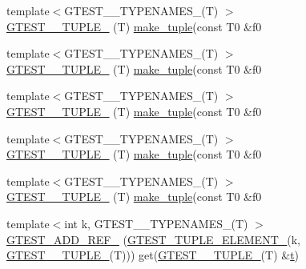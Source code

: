 \begin{DoxyCompactItemize}
{\footnotesize template$<$G\+T\+E\+S\+T\+\_\+\_\+\+T\+Y\+P\+E\+N\+A\+M\+E\+S\+\_\+(\+T) $>$ }\\\mbox{\hyperlink{namespacestd_1_1tr1_a31cde155977a4544af2b44b51ffe69ac}{G\+T\+E\+S\+T\+\_\+\_\+\+T\+U\+P\+L\+E\+\_\+}} (T) \mbox{\hyperlink{namespacestd_1_1tr1_af7e12a0f5b5791b5b7c49a5a17b85359}{make\+\_\+tuple}}(const T0 \&f0
\item 
{\footnotesize template$<$G\+T\+E\+S\+T\+\_\+\_\+\+T\+Y\+P\+E\+N\+A\+M\+E\+S\+\_\+(\+T) $>$ }\\\mbox{\hyperlink{namespacestd_1_1tr1_a61277f5af24b20fce87a9fd94307ab34}{G\+T\+E\+S\+T\+\_\+\_\+\+T\+U\+P\+L\+E\+\_\+}} (T) \mbox{\hyperlink{namespacestd_1_1tr1_af7e12a0f5b5791b5b7c49a5a17b85359}{make\+\_\+tuple}}(const T0 \&f0
\item 
{\footnotesize template$<$G\+T\+E\+S\+T\+\_\+\_\+\+T\+Y\+P\+E\+N\+A\+M\+E\+S\+\_\+(\+T) $>$ }\\\mbox{\hyperlink{namespacestd_1_1tr1_a29c8efcb79a4749e079b704c418266e6}{G\+T\+E\+S\+T\+\_\+\_\+\+T\+U\+P\+L\+E\+\_\+}} (T) \mbox{\hyperlink{namespacestd_1_1tr1_af7e12a0f5b5791b5b7c49a5a17b85359}{make\+\_\+tuple}}(const T0 \&f0
\item 
{\footnotesize template$<$G\+T\+E\+S\+T\+\_\+\_\+\+T\+Y\+P\+E\+N\+A\+M\+E\+S\+\_\+(\+T) $>$ }\\\mbox{\hyperlink{namespacestd_1_1tr1_a6afad1f98814ccc897d0b02bc6fc4e7d}{G\+T\+E\+S\+T\+\_\+\_\+\+T\+U\+P\+L\+E\+\_\+}} (T) \mbox{\hyperlink{namespacestd_1_1tr1_af7e12a0f5b5791b5b7c49a5a17b85359}{make\+\_\+tuple}}(const T0 \&f0
\item 
{\footnotesize template$<$G\+T\+E\+S\+T\+\_\+\_\+\+T\+Y\+P\+E\+N\+A\+M\+E\+S\+\_\+(\+T) $>$ }\\\mbox{\hyperlink{namespacestd_1_1tr1_aa636d3269bf1f368a7bc09ff158bc482}{G\+T\+E\+S\+T\+\_\+\_\+\+T\+U\+P\+L\+E\+\_\+}} (T) \mbox{\hyperlink{namespacestd_1_1tr1_af7e12a0f5b5791b5b7c49a5a17b85359}{make\+\_\+tuple}}(const T0 \&f0
\item 
{\footnotesize template$<$int k, G\+T\+E\+S\+T\+\_\+\_\+\+T\+Y\+P\+E\+N\+A\+M\+E\+S\+\_\+(\+T) $>$ }\\\mbox{\hyperlink{namespacestd_1_1tr1_a495d7fb7a131317a9ba985598d3c1504}{G\+T\+E\+S\+T\+\_\+\+A\+D\+D\+\_\+\+R\+E\+F\+\_\+}} (\mbox{\hyperlink{gtest-tuple_8h_a1b7f133d8aa02e0b7afed7b66781eeb7}{G\+T\+E\+S\+T\+\_\+\+T\+U\+P\+L\+E\+\_\+\+E\+L\+E\+M\+E\+N\+T\+\_\+}}(k, \mbox{\hyperlink{namespacestd_1_1tr1_aa636d3269bf1f368a7bc09ff158bc482}{G\+T\+E\+S\+T\+\_\+\_\+\+T\+U\+P\+L\+E\+\_\+}}(T))) get(\mbox{\hyperlink{namespacestd_1_1tr1_aa636d3269bf1f368a7bc09ff158bc482}{G\+T\+E\+S\+T\+\_\+\_\+\+T\+U\+P\+L\+E\+\_\+}}(T) \&\mbox{\hyperlink{_mutual_8h_a978d88b393c8a37dc2614c88788b3442}{t}})

\end{DoxyCompactItemize}
